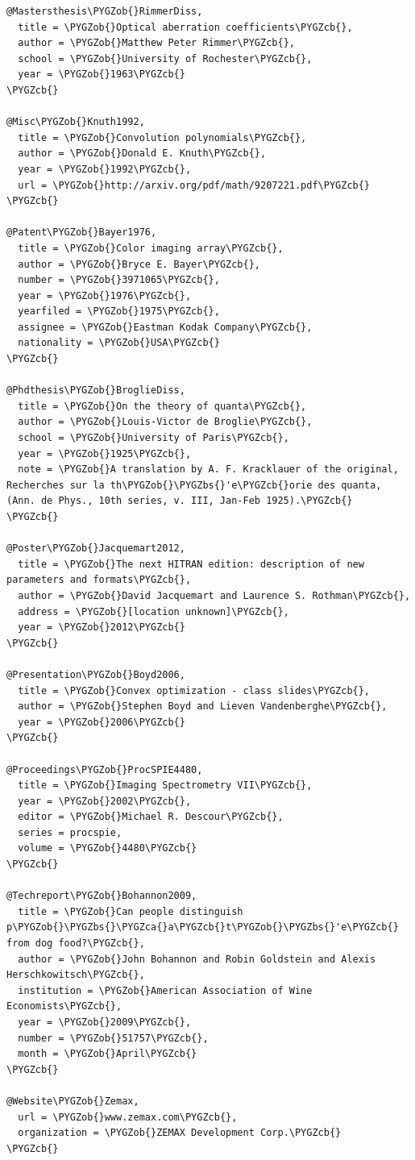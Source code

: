 \documentclass[letterpaper,10pt,english]{sphinxmanual}
\def\PYGZbs{\char`\\}
\def\PYGZob{\char`\{}
\def\PYGZcb{\char`\}}
\def\PYGZca{\char`\^}
\begin{document}
\begin{Verbatim}[commandchars=\\\{\}]
@Mastersthesis\PYGZob{}RimmerDiss,
  title = \PYGZob{}Optical aberration coefficients\PYGZcb{},
  author = \PYGZob{}Matthew Peter Rimmer\PYGZcb{},
  school = \PYGZob{}University of Rochester\PYGZcb{},
  year = \PYGZob{}1963\PYGZcb{}
\PYGZcb{}

@Misc\PYGZob{}Knuth1992,
  title = \PYGZob{}Convolution polynomials\PYGZcb{},
  author = \PYGZob{}Donald E. Knuth\PYGZcb{},
  year = \PYGZob{}1992\PYGZcb{},
  url = \PYGZob{}http://arxiv.org/pdf/math/9207221.pdf\PYGZcb{}
\PYGZcb{}

@Patent\PYGZob{}Bayer1976,
  title = \PYGZob{}Color imaging array\PYGZcb{},
  author = \PYGZob{}Bryce E. Bayer\PYGZcb{},
  number = \PYGZob{}3971065\PYGZcb{},
  year = \PYGZob{}1976\PYGZcb{},
  yearfiled = \PYGZob{}1975\PYGZcb{},
  assignee = \PYGZob{}Eastman Kodak Company\PYGZcb{},
  nationality = \PYGZob{}USA\PYGZcb{}
\PYGZcb{}

@Phdthesis\PYGZob{}BroglieDiss,
  title = \PYGZob{}On the theory of quanta\PYGZcb{},
  author = \PYGZob{}Louis-Victor de Broglie\PYGZcb{},
  school = \PYGZob{}University of Paris\PYGZcb{},
  year = \PYGZob{}1925\PYGZcb{},
  note = \PYGZob{}A translation by A. F. Kracklauer of the original, Recherches sur la th\PYGZob{}\PYGZbs{}'e\PYGZcb{}orie des quanta, (Ann. de Phys., 10th series, v. III, Jan-Feb 1925).\PYGZcb{}
\PYGZcb{}

@Poster\PYGZob{}Jacquemart2012,
  title = \PYGZob{}The next HITRAN edition: description of new parameters and formats\PYGZcb{},
  author = \PYGZob{}David Jacquemart and Laurence S. Rothman\PYGZcb{},
  address = \PYGZob{}[location unknown]\PYGZcb{},
  year = \PYGZob{}2012\PYGZcb{}
\PYGZcb{}

@Presentation\PYGZob{}Boyd2006,
  title = \PYGZob{}Convex optimization - class slides\PYGZcb{},
  author = \PYGZob{}Stephen Boyd and Lieven Vandenberghe\PYGZcb{},
  year = \PYGZob{}2006\PYGZcb{}
\PYGZcb{}

@Proceedings\PYGZob{}ProcSPIE4480,
  title = \PYGZob{}Imaging Spectrometry VII\PYGZcb{},
  year = \PYGZob{}2002\PYGZcb{},
  editor = \PYGZob{}Michael R. Descour\PYGZcb{},
  series = procspie,
  volume = \PYGZob{}4480\PYGZcb{}
\PYGZcb{}

@Techreport\PYGZob{}Bohannon2009,
  title = \PYGZob{}Can people distinguish p\PYGZob{}\PYGZbs{}\PYGZca{}a\PYGZcb{}t\PYGZob{}\PYGZbs{}'e\PYGZcb{} from dog food?\PYGZcb{},
  author = \PYGZob{}John Bohannon and Robin Goldstein and Alexis Herschkowitsch\PYGZcb{},
  institution = \PYGZob{}American Association of Wine Economists\PYGZcb{},
  year = \PYGZob{}2009\PYGZcb{},
  number = \PYGZob{}51757\PYGZcb{},
  month = \PYGZob{}April\PYGZcb{}
\PYGZcb{}

@Website\PYGZob{}Zemax,
  url = \PYGZob{}www.zemax.com\PYGZcb{},
  organization = \PYGZob{}ZEMAX Development Corp.\PYGZcb{}
\PYGZcb{}
\end{Verbatim}
\end{document}
